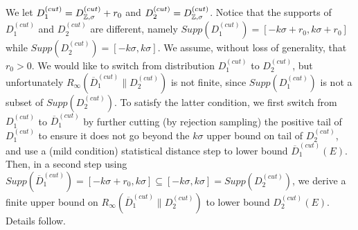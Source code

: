 We let $D_1^{(cut)} = D_{\mathbb{Z},\sigma}^{(cut)} + r_0$ and
$D_2^{(cut)} = D_{\mathbb{Z},\sigma}^{(cut)}$. Notice that the supports of
$D_1^{(cut)}$ and $D_2^{(cut)}$ are different, namely
$Supp(D_1^{(cut)}) = [-k\sigma+r_0,k\sigma+r_0]$ while
$Supp(D_2^{(cut)}) = [-k\sigma,k\sigma]$. We assume, without loss of generality,
that $r_0 > 0$. We would like to switch from distribution $D_1^{(cut)}$ to
$D_2^{(cut)}$, but unfortunately $R_\infty(\overline{D}_1^{(cut)}\|D_2^{(cut)})$
is not finite, since $Supp(D_1^{(cut)})$ is not a subset of
$Supp(D_2^{(cut)})$. To satisfy the latter condition, we first switch from
$D_1^{(cut)}$ to $\overline{D}_1^{(cut)}$ by further cutting (by rejection
sampling) the positive tail of $D_1^{(cut)}$ to ensure it does not go beyond the
$k \sigma$ upper bound on tail of $D_2^{(cut)}$, and use a (mild condition)
statistical distance step to lower bound $\overline{D}_1^{(cut)}(E)$. Then, in a
second step using
$Supp(\overline{D}_1^{(cut)})=[-k\sigma+r_0, k\sigma] \subseteq
[-k\sigma,k\sigma] = Supp(D_2^{(cut)})$, we derive a finite upper bound on
$R_\infty(\overline{D}_1^{(cut)}\|D_2^{(cut)})$ to lower bound
$D_2^{(cut)}(E)$. Details follow.
